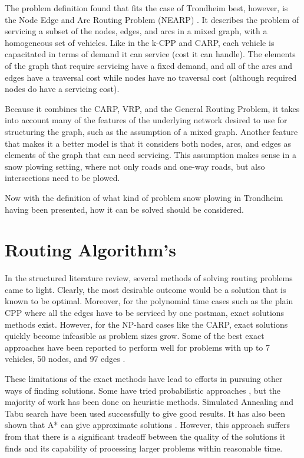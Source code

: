 The problem definition found that fits the case of Trondheim best, however, is the Node Edge and Arc Routing Problem (NEARP) \citep{prins2005memeticNEARP}. It describes the problem of servicing a subset of the nodes, edges, and arcs in a mixed graph, with a homogeneous set of vehicles. Like in the k-CPP and CARP, each vehicle is capacitated in terms of demand it can service (cost it can handle). The elements of the graph that require servicing have a fixed demand, and all of the arcs and edges have a traversal cost while nodes have no traversal cost (although required nodes do have a servicing cost).

Because it combines the CARP, VRP, and the General Routing Problem, it takes into account many of the features of the underlying network desired to use for structuring the graph, such as the assumption of a mixed graph. Another feature that makes it a better model is that it considers both nodes, arcs, and edges as elements of the graph that can need servicing. This assumption makes sense in a snow plowing setting, where not only roads and one-way roads, but also intersections need to be plowed.

Now with the definition of what kind of problem snow plowing in Trondheim having been presented, how it can be solved should be considered.




\section{Routing Algorithm's} %
\label{sec:routing_algorithms}

In the structured literature review, several methods of solving routing problems came to light. Clearly, the most desirable outcome would be a solution that is known to be optimal. Moreover, for the polynomial time cases such as the plain CPP where all the edges have to be serviced by one postman, exact solutions methods exist. However, for the NP-hard cases like the CARP, exact solutions quickly become infeasible as problem sizes grow. Some of the best exact approaches have been reported to perform well for problems with up to 7 vehicles, 50 nodes, and 97 edges \citep{belenguer2003cutting}.

These limitations of the exact methods have lead to efforts in pursuing other ways of finding solutions. Some have tried probabilistic approaches \citep{christiansen2009branch}, but the majority of work has been done on heuristic methods. Simulated Annealing \citep{eglese1994simulatedAnnealing} and Tabu search \citep{brandao2008tabu} have been used successfully to give good results. It has also been shown that A* can give approximate solutions \citep{rao2011AStar}. However, this approach suffers from that there is a significant tradeoff between the quality of the solutions it finds and its capability of processing larger problems within reasonable time.


